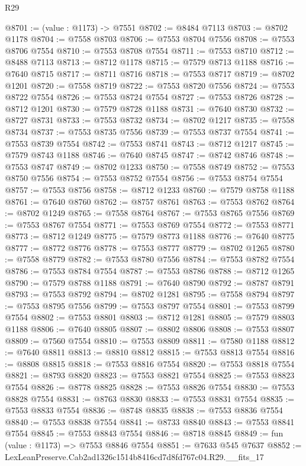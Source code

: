 \begin{lexlean}{R29}
\begin{coremodule}
@8701 := (value : @1173) -> @7551
@8702 := @8484 @7113
@8703 := @8702 @1178
@8704 := @7558 @8703
@8706 := @7553 @8704 @7556
@8708 := @7553 @8706 @7554
@8710 := @7553 @8708 @7554
@8711 := @7553 @8710
@8712 := @8488 @7113
@8713 := @8712 @1178
@8715 := @7579 @8713 @1188
@8716 := @7640 @8715
@8717 := @8711 @8716
@8718 := @7553 @8717
@8719 := @8702 @1201
@8720 := @7558 @8719
@8722 := @7553 @8720 @7556
@8724 := @7553 @8722 @7554
@8726 := @7553 @8724 @7554
@8727 := @7553 @8726
@8728 := @8712 @1201
@8730 := @7579 @8728 @1188
@8731 := @7640 @8730
@8732 := @8727 @8731
@8733 := @7553 @8732
@8734 := @8702 @1217
@8735 := @7558 @8734
@8737 := @7553 @8735 @7556
@8739 := @7553 @8737 @7554
@8741 := @7553 @8739 @7554
@8742 := @7553 @8741
@8743 := @8712 @1217
@8745 := @7579 @8743 @1188
@8746 := @7640 @8745
@8747 := @8742 @8746
@8748 := @7553 @8747
@8749 := @8702 @1233
@8750 := @7558 @8749
@8752 := @7553 @8750 @7556
@8754 := @7553 @8752 @7554
@8756 := @7553 @8754 @7554
@8757 := @7553 @8756
@8758 := @8712 @1233
@8760 := @7579 @8758 @1188
@8761 := @7640 @8760
@8762 := @8757 @8761
@8763 := @7553 @8762
@8764 := @8702 @1249
@8765 := @7558 @8764
@8767 := @7553 @8765 @7556
@8769 := @7553 @8767 @7554
@8771 := @7553 @8769 @7554
@8772 := @7553 @8771
@8773 := @8712 @1249
@8775 := @7579 @8773 @1188
@8776 := @7640 @8775
@8777 := @8772 @8776
@8778 := @7553 @8777
@8779 := @8702 @1265
@8780 := @7558 @8779
@8782 := @7553 @8780 @7556
@8784 := @7553 @8782 @7554
@8786 := @7553 @8784 @7554
@8787 := @7553 @8786
@8788 := @8712 @1265
@8790 := @7579 @8788 @1188
@8791 := @7640 @8790
@8792 := @8787 @8791
@8793 := @7553 @8792
@8794 := @8702 @1281
@8795 := @7558 @8794
@8797 := @7553 @8795 @7556
@8799 := @7553 @8797 @7554
@8801 := @7553 @8799 @7554
@8802 := @7553 @8801
@8803 := @8712 @1281
@8805 := @7579 @8803 @1188
@8806 := @7640 @8805
@8807 := @8802 @8806
@8808 := @7553 @8807
@8809 := @7560 @7554
@8810 := @7553 @8809
@8811 := @7580 @1188
@8812 := @7640 @8811
@8813 := @8810 @8812
@8815 := @7553 @8813 @7554
@8816 := @8808 @8815
@8818 := @7553 @8816 @7554
@8820 := @7553 @8818 @7554
@8821 := @8793 @8820
@8823 := @7553 @8821 @7554
@8825 := @7553 @8823 @7554
@8826 := @8778 @8825
@8828 := @7553 @8826 @7554
@8830 := @7553 @8828 @7554
@8831 := @8763 @8830
@8833 := @7553 @8831 @7554
@8835 := @7553 @8833 @7554
@8836 := @8748 @8835
@8838 := @7553 @8836 @7554
@8840 := @7553 @8838 @7554
@8841 := @8733 @8840
@8843 := @7553 @8841 @7554
@8845 := @7553 @8843 @7554
@8846 := @8718 @8845
@8849 := fun (value : @1173) => @7553 @8846 @7554
@8851 := @7633 @545 @7637
@8852 := LexLeanPreserve.Cab2ad1326c1514b8416cd7d8fd767c04.R29.__fits_17

\end{coremodule}
\end{lexlean}
